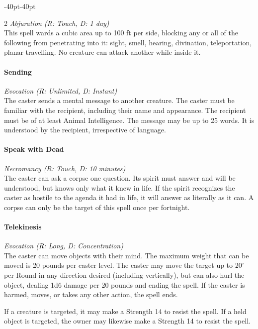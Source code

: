 \documentclass{book}
\begin{document}
\begin{adjustwidth}{-40pt}{-40pt}
\begin{multicols}{2}
\emph{Abjuration (R: Touch, D: 1 day)}\\
This spell wards a cubic area up to 100 ft per side, blocking any or all
of the following from penetrating into it: sight, smell, hearing,
divination, teleportation, planar travelling. No creature can attack
another while inside it.

\paragraph{Sending}\label{sending}

\emph{Evocation (R: Unlimited, D: Instant)}\\
The caster sends a mental message to another creature. The caster must
be familiar with the recipient, including their name and appearance. The
recipient must be of at least Animal Intelligence. The message may be up
to 25 words. It is understood by the recipient, irrespective of
language.

\paragraph{Speak with Dead}\label{speak-with-dead}

\emph{Necromancy (R: Touch, D: 10 minutes)}\\
The caster can ask a corpse one question. Its spirit must answer and
will be understood, but knows only what it knew in life. If the spirit
recognizes the caster as hostile to the agenda it had in life, it will
answer as literally as it can. A corpse can only be the target of this
spell once per fortnight.

\paragraph{Telekinesis}\label{telekinesis}

\emph{Evocation (R: Long, D: Concentration)}\\
The caster can move objects with their mind. The maximum weight that can
be moved is 20 pounds per caster level. The caster may move the target
up to 20' per Round in any direction desired (including vertically), but
can also hurl the object, dealing 1d6 damage per 20 pounds and ending
the spell. If the caster is harmed, moves, or takes any other action,
the spell ends.

If a creature is targeted, it may make a Strength 14 to resist the
spell. If a held object is targeted, the owner may likewise make a
Strength 14 to resist the spell.


\end{multicols}
\end{adjustwidth}
\end{document}
